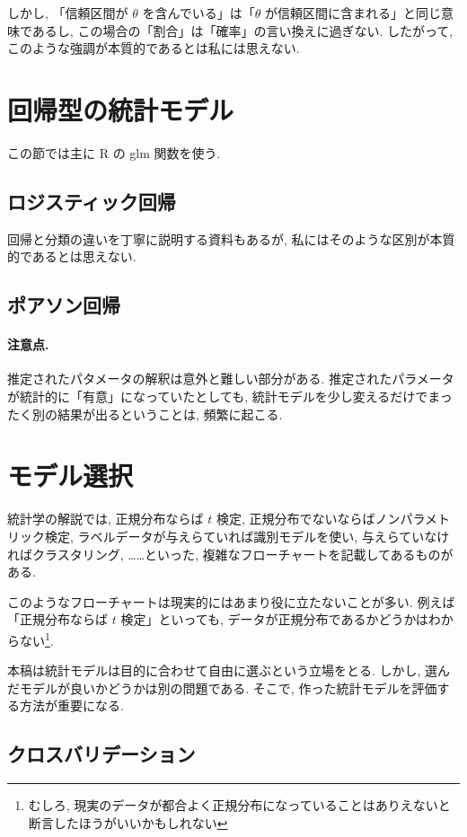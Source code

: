 \documentclass[a4paper, 12pt]{jarticle}
\begin{document}
しかし, 「信頼区間が $\theta$ を含んでいる」は「$\theta$ が信頼区間に含まれる」と同じ意味であるし, この場合の「割合」は「確率」の言い換えに過ぎない. したがって, このような強調が本質的であるとは私には思えない. 

\section{回帰型の統計モデル}

この節では主に R の glm 関数を使う. 

\subsection{ロジスティック回帰}

回帰と分類の違いを丁寧に説明する資料もあるが, 私にはそのような区別が本質的であるとは思えない. 

\subsection{ポアソン回帰}

\paragraph{注意点.} 推定されたパタメータの解釈は意外と難しい部分がある. 
推定されたパラメータが統計的に「有意」になっていたとしても, 統計モデルを少し変えるだけでまったく別の結果が出るということは, 頻繁に起こる. 

\section{モデル選択}

統計学の解説では, 正規分布ならば $t$ 検定, 正規分布でないならばノンパラメトリック検定, ラベルデータが与えらていれば識別モデルを使い, 与えらていなければクラスタリング, ……といった, 複雑なフローチャートを記載してあるものがある. 

このようなフローチャートは現実的にはあまり役に立たないことが多い. 例えば「正規分布ならば $t$ 検定」といっても, データが正規分布であるかどうかはわからない\footnote{むしろ, 現実のデータが都合よく正規分布になっていることはありえないと断言したほうがいいかもしれない}. 

本稿は統計モデルは目的に合わせて自由に選ぶという立場をとる. しかし, 選んだモデルが良いかどうかは別の問題である. 
そこで, 作った統計モデルを評価する方法が重要になる.


\subsection{クロスバリデーション}
\end{document}
